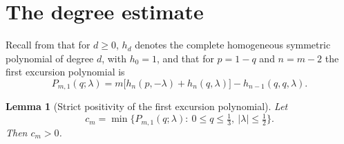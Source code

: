 \documentclass[11pt]{article}
\newtheorem{lemma}[theorem]{Lemma}
\theoremstyle{remark}
\newcommand{\abs}[1]{\left\lvert #1\right\rvert}
\begin{document}
\section{The degree estimate}
\label{sec:degree}

Recall from \cite[Section~3]{kim2026goodman} that for $d\geq0$, $h_d$ denotes the
complete homogeneous symmetric polynomial of degree $d$, with $h_0=1$,
and that for $p=1-q$ and $n=m-2$ the first excursion polynomial is
\begin{equation}\label{eq:first-poly}
 P_{m,1}(q;\lambda)
 =m\bigl[h_{n}(p,-\lambda)+h_{n}(q,\lambda)\bigr]
   -h_{n-1}(q,q,\lambda).
\end{equation}

\begin{lemma}[Strict positivity of the first excursion polynomial]
\label{lem:first-poly}
Let
\[
 c_m=\min\bigl\{P_{m,1}(q;\lambda):\ 0\leq q\leq\tfrac13,\
 \abs{\lambda}\leq\tfrac12\bigr\}.
\]
Then $c_m>0$.
\end{lemma}
\end{document}
